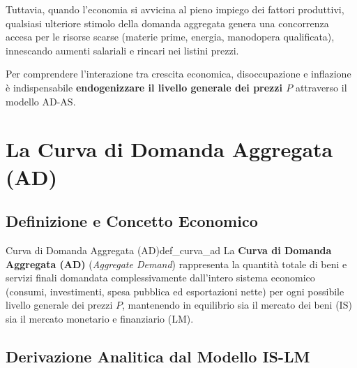Tuttavia, quando l'economia si avvicina al pieno impiego dei fattori produttivi, qualsiasi ulteriore stimolo della domanda aggregata genera una concorrenza accesa per le risorse scarse (materie prime, energia, manodopera qualificata), innescando aumenti salariali e rincari nei listini prezzi.

Per comprendere l'interazione tra crescita economica, disoccupazione e inflazione è indispensabile \textbf{endogenizzare il livello generale dei prezzi $P$} attraverso il modello AD-AS.

\section{La Curva di Domanda Aggregata (AD)}

\subsection{Definizione e Concetto Economico}

\begin{definizione}{Curva di Domanda Aggregata (AD)}{def_curva_ad}
La \textbf{Curva di Domanda Aggregata (AD)} (\textit{Aggregate Demand}) rappresenta la quantità totale di beni e servizi finali domandata complessivamente dall'intero sistema economico (consumi, investimenti, spesa pubblica ed esportazioni nette) per ogni possibile livello generale dei prezzi $P$, mantenendo in equilibrio sia il mercato dei beni (IS) sia il mercato monetario e finanziario (LM).
\end{definizione}

\subsection{Derivazione Analitica dal Modello IS-LM}

